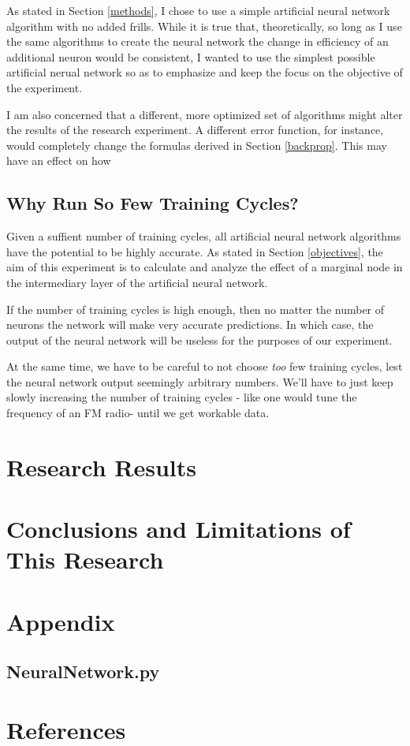 \documentclass[12pt]{article}
\begin{document}
        As stated in Section \ref{methods}, I chose to use a simple artificial neural network algorithm with no added frills. While it is true that, theoretically, so long as I use the same algorithms to create the neural network the change in efficiency of an additional neuron would be consistent, I wanted to use the simplest possible artificial nerual network so as to emphasize and keep the focus on the objective of the experiment.

        I am also concerned that a different, more optimized set of algorithms might alter the results of the research experiment. A different error function, for instance, would completely change the formulas derived in Section \ref{backprop}. This may have an effect on how 
    
    \subsection{Why Run So Few Training Cycles?}

        Given a suffient number of training cycles, all artificial neural network algorithms have the potential to be highly accurate. As stated in Section \ref{objectives}, the aim of this experiment is to calculate and analyze the effect of a marginal node in the intermediary layer of the artificial neural network.

        If the number of training cycles is high enough, then no matter the number of neurons the network will make very accurate predictions. In which case, the output of the neural network will be useless for the purposes of our experiment. 

        At the same time, we have to be careful to not choose \textit{too} few training cycles, lest the neural network output seemingly arbitrary numbers. We'll have to just keep slowly increasing the number of training cycles - like one would tune the frequency of an FM radio- until we get workable data.

\section{Research Results \label{results}}

\section{Conclusions and Limitations of This Research \label{conclusions}}

\section{Appendix}

    \subsection{NeuralNetwork.py}

\section{References}

    \printbibliography[heading=none]
\end{document}
